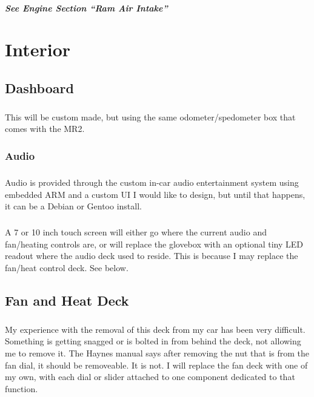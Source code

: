 \documentclass[a4paper,10pt]{report}
\begin{document}
\paragraph*{See Engine Section ``Ram Air Intake'' }



\chapter{Interior}
\section{Dashboard}
\paragraph*{}This will be custom made, but using the same odometer/spedometer box that comes with the MR2. 
\subsection{Audio}
\paragraph*{}Audio is provided through the custom in-car audio entertainment system using embedded ARM and a custom UI I would like to design, but until that happens, it can be a Debian or Gentoo install.
\paragraph*{}A 7 or 10 inch touch screen will either go where the current audio and fan/heating controls are, or will replace the glovebox with an optional tiny LED readout where the audio deck used to reside. This is because I may replace the fan/heat control deck. See below.
\section{Fan and Heat Deck}
\paragraph*{}My experience with the removal of this deck from my car has been very difficult. Something is getting snagged or is bolted in from behind the deck, not allowing me to remove it. The Haynes manual says after removing the nut that is from the fan dial, it should be removeable. It is not. I will replace the fan deck with one of my own, with each dial or slider attached to one component dedicated to that function. 
\end{document}
